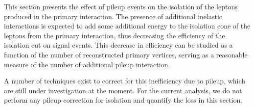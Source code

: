 This section presents the effect of pileup events on the isolation of the leptons 
produced in the primary interaction. The presence of additional inelastic
interactions is expected to add some additional energy to the isolation cone
of the leptons from the primary interaction, thus decreasing the efficiency
of the isolation cut on signal events. This decrease in efficiency can be 
studied as a function of the number of reconstructed primary vertices, serving
as a reasonable measure of the number of additional pileup interaction.

A number of techniques exist to correct for this inefficiency due to pileup,
which are still under investigation at the moment. For the current analysis, 
we do not perform any pileup correction for isolation and quantify the loss
in this section.

